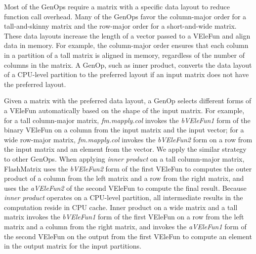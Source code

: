Most of the GenOps require a matrix with a specific data layout to reduce
function call overhead.
Many of the GenOps favor the column-major order for a tall-and-skinny matrix
and the row-major order for a short-and-wide matrix. These data layouts increase
the length of a vector passed to a VEleFun and align data in memory. For example,
the column-major order ensures that each column in a partition of a tall matrix
is aligned in memory, regardless of the number of columns in the matrix. A GenOp,
such as inner product, converts the data layout of a CPU-level partition to
the preferred layout if an input matrix does not have the preferred layout.

Given a matrix with the preferred data layout, a GenOp selects different forms
of a VEleFun automatically based on the shape of the input matrix. For example,
for a tall column-major matrix, \textit{fm.mapply.col} invokes the \textit{bVEleFun1}
form of the binary VEleFun on a column from the input matrix and the input vector;
for a wide row-major matrix, \textit{fm.mapply.col} invokes the \textit{bVEleFun2}
form on a row from the input matrix and an element from the vector. We apply
the similar strategy to other GenOps. When applying \textit{inner product}
on a tall column-major matrix, FlashMatrix uses the \textit{bVEleFun2} form of
the first VEleFun to computes the outer product of a column from the left matrix
and a row from the right matrix, and uses the \textit{aVEleFun2} of the second VEleFun
to compute the final result. Because \textit{inner product} operates on
a CPU-level partition, all intermediate results in the computation reside
in CPU cache. Inner product on a wide matrix and a tall matrix invokes the
\textit{bVEleFun1} form of the first VEleFun on a row from the left matrix and a column
from the right matrix, and invokes the \textit{aVEleFun1} form of the second VEleFun
on the output from the first VEleFun to compute an element in the output matrix for
the input partitions.


